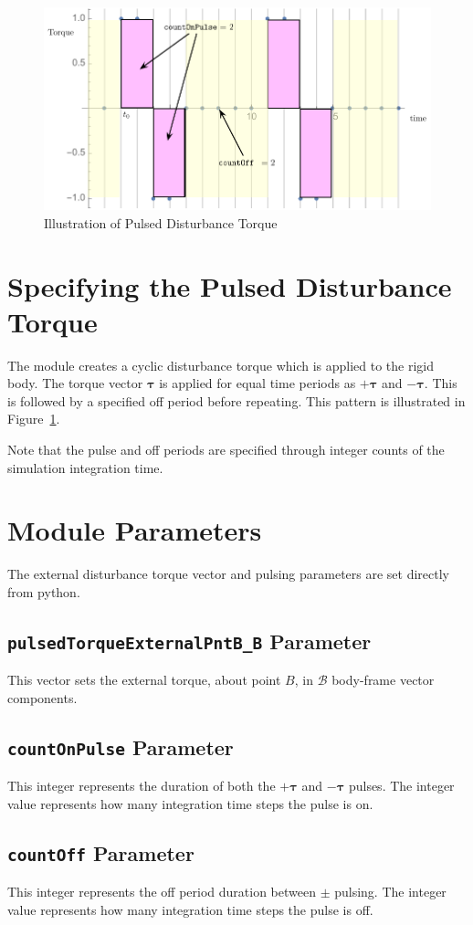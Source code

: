 \documentclass[]{BasiliskReportMemo}
\begin{document}
\begin{figure}[htb]
	\centerline{
	\includegraphics[]{Figures/TorqueDiagram2}
	}
	\caption{Illustration of Pulsed Disturbance Torque }
	\label{fig:extPulse2}
\end{figure}
\section{Specifying the Pulsed Disturbance Torque}
The module creates a cyclic disturbance torque which is applied to the rigid body.  The torque vector $\bm\tau$ is applied for equal time periods as $+\bm\tau$ and $-\bm\tau$.  This is followed by a specified off period before repeating.  This pattern is illustrated in Figure~\ref{fig:extPulse2}.  

Note that the pulse and off periods are specified through integer counts of the simulation integration time.




\section{Module Parameters}
The external disturbance torque vector and pulsing parameters are set directly from python.  

\subsection{{\tt pulsedTorqueExternalPntB\_B} Parameter}
This vector sets the external torque, about point $B$, in $\mathcal{B}$ body-frame vector components.

\subsection{{\tt countOnPulse} Parameter}
This integer represents the duration of both the $+\bm\tau$ and $-\bm\tau$ pulses.  The integer value represents how many integration time steps the pulse is on.

\subsection{{\tt countOff} Parameter}
This integer represents the off period duration between $\pm$ pulsing.  The integer value represents how many integration time steps the pulse is off.
\end{document}
